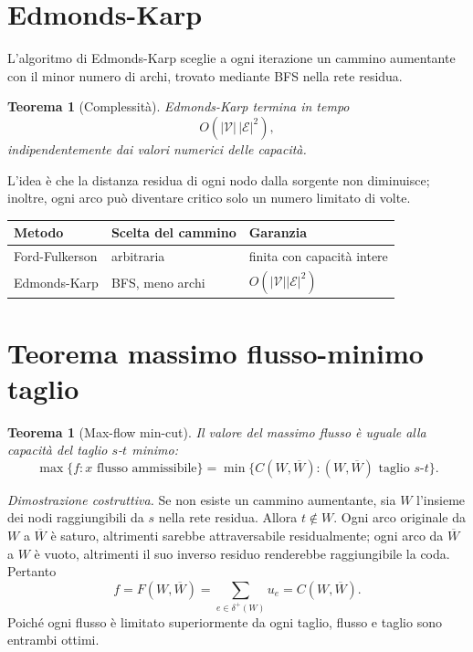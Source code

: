 \documentclass[11pt,a4paper]{article}
\newtheorem{theorem}[definition]{Teorema}
\newcommand{\V}{\mathcal{V}}
\newcommand{\E}{\mathcal{E}}
\newcommand{\Wbar}{\overline W}
\begin{document}
\section{Edmonds-Karp}

L'algoritmo di Edmonds-Karp sceglie a ogni iterazione un cammino aumentante con il minor numero di archi, trovato mediante BFS nella rete residua.

\begin{theorem}[Complessità]
Edmonds-Karp termina in tempo
\[
O(|\V|\,|\E|^2),
\]
indipendentemente dai valori numerici delle capacità.
\end{theorem}

L'idea è che la distanza residua di ogni nodo dalla sorgente non diminuisce; inoltre, ogni arco può diventare critico solo un numero limitato di volte.

\begin{center}
\begin{tabular}{lll}
\toprule
Metodo & Scelta del cammino & Garanzia\\
\midrule
Ford-Fulkerson & arbitraria & finita con capacità intere\\
Edmonds-Karp & BFS, meno archi & $O(|\V||\E|^2)$\\
\bottomrule
\end{tabular}
\end{center}

\section{Teorema massimo flusso-minimo taglio}

\begin{theorem}[Max-flow min-cut]
Il valore del massimo flusso è uguale alla capacità del taglio $s$-$t$ minimo:
\[
\max\{f:x\text{ flusso ammissibile}\}
=
\min\{C(W,\Wbar):(W,\Wbar)\text{ taglio }s\text{-}t\}.
\]
\end{theorem}

\emph{Dimostrazione costruttiva.} Se non esiste un cammino aumentante, sia $W$ l'insieme dei nodi raggiungibili da $s$ nella rete residua. Allora $t\notin W$. Ogni arco originale da $W$ a $\Wbar$ è saturo, altrimenti sarebbe attraversabile residualmente; ogni arco da $\Wbar$ a $W$ è vuoto, altrimenti il suo inverso residuo renderebbe raggiungibile la coda. Pertanto
\[
f=F(W,\Wbar)=\sum_{e\in\delta^+(W)}u_e=C(W,\Wbar).
\]
Poiché ogni flusso è limitato superiormente da ogni taglio, flusso e taglio sono entrambi ottimi.
\end{document}
